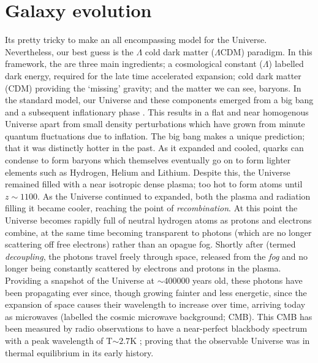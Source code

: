 \section{Galaxy evolution} \label{sec:gal_evo_intro}
Its pretty tricky to make an all encompassing model for the Universe. Nevertheless, our best guess is the $\Lambda$ cold dark matter ($\Lambda$CDM) paradigm. In this framework, the are three main ingredients; a cosmological constant ($\Lambda$) labelled dark energy, required for the late time accelerated expansion; cold dark matter (CDM) providing the `missing' gravity; and the matter we can see, baryons. In the standard model, our Universe and these components emerged from a big bang and a subsequent inflationary phase \citep[epoch of accelerated expansion;][]{guth1981}. This results in a flat and near homogenous Universe apart from small density perturbations which have grown from minute quantum fluctuations due to inflation. The big bang makes a unique prediction; that it was distinctly hotter in the past. As it expanded and cooled, quarks can condense to form baryons which themselves eventually go on to form lighter elements such as Hydrogen, Helium and Lithium. Despite this, the Universe remained filled with a near isotropic dense plasma; too hot to form atoms until $z \sim 1100$. As the Universe continued to expanded, both the plasma and radiation filling it became cooler, reaching the point of \textit{recombination}. At this point the Universe becomes rapidly full of neutral hydrogen atoms as protons and electrons combine, at the same time becoming transparent to photons (which are no longer scattering off free electrons) rather than an opague fog. Shortly after (termed \textit{decoupling}, the photons travel freely through space, released from the \textit{fog} and no longer being constantly scattered by electrons and protons in the plasma. Providing a snapshot of the Universe at $\sim 400000$ years old, these photons have been propagating ever since, though growing fainter and less energetic, since the expansion of space causes their wavelength to increase over time, arriving today as microwaves (labelled the cosmic microwave background; CMB). This CMB has been measured by radio observations to have a near-perfect blackbody spectrum with a peak wavelength of T$\sim 2.7$K \citep{planck2016xiii}; proving that the observable Universe was in thermal equilibrium in its early history.

